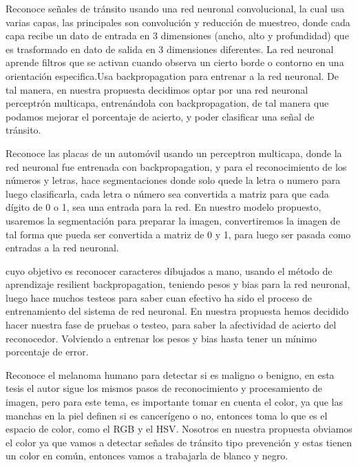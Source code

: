 \documentclass[a4paper, 12pt]{article}
\begin{document}
\vskip 1cm
\citep{ayunque} Reconoce señales de tránsito usando una red neuronal convolucional, la cual usa varias capas, las principales son convolución y reducción de muestreo, donde cada capa recibe un dato de entrada en 3 dimensiones (ancho, alto y profundidad) que es trasformado en dato de salida en 3 dimensiones diferentes. La red neuronal aprende filtros que se activan cuando observa un cierto borde o contorno en una orientación especifica.Usa backpropagation para entrenar a la red neuronal.
De tal manera, en nuestra propuesta decidimos optar por una red neuronal perceptrón multicapa, entrenándola con backpropagation, de tal manera que podamos mejorar el porcentaje de acierto, y poder clasificar una señal de tránsito.\par


\vskip 1cm
\citep{diazrojas} Reconoce las placas de un automóvil usando un perceptron multicapa, donde la red neuronal fue entrenada con backpropagation, y para el reconocimiento de los números y letras, hace segmentaciones donde solo quede la letra o numero para luego clasificarla, cada letra o número sea convertida a matriz para que cada dígito de 0 o 1, sea una entrada para la red.
En nuestro modelo propuesto, usaremos la segmentación para preparar la imagen, convertiremos la imagen de tal forma que pueda ser convertida a matriz de 0 y 1, para luego ser pasada como entradas a la red neuronal.\par

\vskip 1cm
\citep{carranzahernandez} cuyo objetivo es reconocer caracteres dibujados a mano, usando el método de aprendizaje resilient backpropagation, teniendo pesos y bias para la red neuronal, luego hace muchos testeos para saber cuan efectivo ha sido el proceso de entrenamiento del sistema de red neuronal.
En nuestra propuesta hemos decidido hacer nuestra fase de pruebas o testeo, para saber la afectividad de acierto del reconocedor. Volviendo a entrenar los pesos y bias hasta tener un mínimo porcentaje de error.\par

\vskip 1cm
\citep{camposaquino} Reconoce el melanoma humano para detectar si es maligno o benigno, en esta tesis el autor sigue los mismos pasos de reconocimiento y procesamiento de imagen, pero para este tema, es importante tomar en cuenta el color, ya que las manchas en la piel definen si es cancerígeno o no, entonces toma lo que es el espacio de color, como el RGB y el HSV.
Nosotros en nuestra propuesta obviamos el color ya que vamos a detectar señales de tránsito tipo prevención y estas tienen un color en común, entonces vamos a trabajarla de blanco y negro.\par
\end{document}

